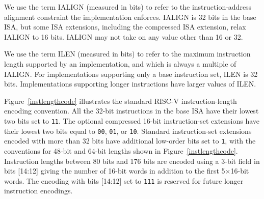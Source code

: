 We use the term IALIGN (measured in bits) to refer to the instruction-address
alignment constraint the implementation enforces.  IALIGN is 32 bits in the
base ISA, but some ISA extensions, including the compressed ISA extension,
relax IALIGN to 16 bits.  IALIGN may not take on any value other than 16 or
32.

We use the term ILEN (measured in bits) to refer to the maximum
instruction length supported by an implementation, and which is always
a multiple of IALIGN.  For implementations supporting only a base
instruction set, ILEN is 32 bits.  Implementations supporting longer
instructions have larger values of ILEN.

Figure~\ref{instlengthcode} illustrates the standard RISC-V
instruction-length encoding convention.  All the 32-bit instructions
in the base ISA have their lowest two bits set to {\tt 11}.  The
optional compressed 16-bit instruction-set extensions have their
lowest two bits equal to {\tt 00}, {\tt 01}, or {\tt 10}.  Standard
instruction-set extensions encoded with more than 32 bits have
additional low-order bits set to {\tt 1}, with the conventions for
48-bit and 64-bit lengths shown in Figure~\ref{instlengthcode}.
Instruction lengths between 80 bits and 176 bits are encoded using a
3-bit field in bits [14:12] giving the number of 16-bit words in
addition to the first 5$\times$16-bit words.  The encoding with bits
[14:12] set to {\tt 111} is reserved for future longer instruction
encodings.

